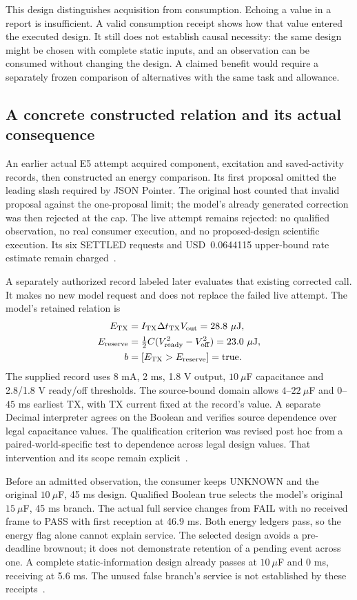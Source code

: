 This design distinguishes acquisition from consumption. Echoing a value in
a report is insufficient. A valid consumption receipt shows how that value
entered the executed design. It still does not establish causal necessity:
the same design might be chosen with complete static inputs, and an
observation can be consumed without changing the design. A claimed benefit
would require a separately frozen comparison of alternatives with the same
task and allowance.

\subsection{A concrete constructed relation and its actual consequence}
An earlier actual E5 attempt acquired component, excitation and saved-activity
records, then constructed an energy comparison. Its first proposal omitted
the leading slash required by JSON Pointer. The original host counted that
invalid proposal against the one-proposal limit; the model's already generated
correction was then rejected at the cap. The live attempt remains rejected:
no qualified observation, no real consumer execution, and no proposed-design
scientific execution. Its six SETTLED requests and USD~0.0644115 upper-bound
rate estimate remain charged~\cite{original}.

A separately authorized record labeled
 later evaluates that existing
corrected call. It makes no new model request and does not replace the
failed live attempt. The model's retained relation is
\begin{align}
 E_{\rm TX}&=I_{\rm TX}\Delta t_{\rm TX}V_{\rm out}=28.8~\mu\mathrm J,\\
 E_{\rm reserve}&=\tfrac12 C(V_{\rm ready}^2-V_{\rm off}^2)=23.0~\mu\mathrm J,\\
 b&=[E_{\rm TX}>E_{\rm reserve}]=\mathrm{true}.
\end{align}
The supplied record uses 8 mA, 2 ms, 1.8 V output, $10~\mu$F capacitance
and 2.8/1.8 V ready/off thresholds. The source-bound domain allows
$4$--$22~\mu$F and $0$--$45$ ms earliest TX, with TX current fixed at
the record's value. A separate Decimal interpreter agrees on the Boolean
and verifies source dependence over legal capacitance values. The
qualification criterion was revised post hoc from a paired-world-specific
test to dependence across legal design values. That intervention and its
scope remain explicit~\cite{posthoc}.

Before an admitted observation, the consumer keeps UNKNOWN and the original
$10~\mu$F, 45 ms design. Qualified Boolean true selects the model's
original $15~\mu$F, 45 ms branch. The actual full service changes from
FAIL with no received frame to PASS with first reception at 46.9 ms. Both
energy ledgers pass, so the energy flag alone cannot explain service. The
selected design avoids a pre-deadline brownout; it does not demonstrate
retention of a pending event across one. A complete static-information
design already passes at $10~\mu$F and 0 ms, receiving at 5.6 ms.
The unused false branch's service is not established by these
receipts~\cite{posthoc}.

